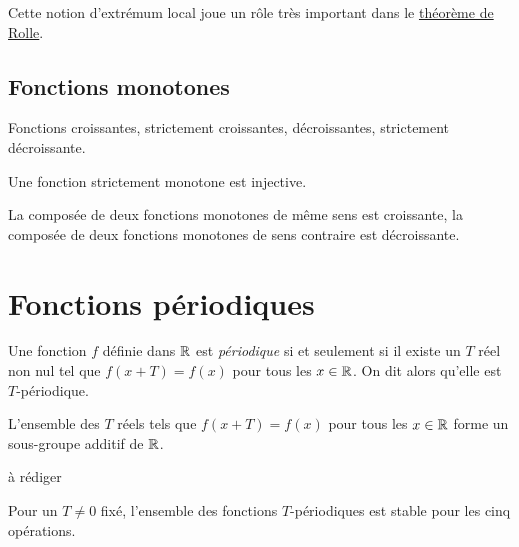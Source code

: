 Cette notion d'extrémum local joue un rôle très important dans le  \href{\baseurl C2070.pdf}{théorème de Rolle}.

\subsection{Fonctions monotones}
Fonctions croissantes, strictement croissantes, décroissantes, strictement décroissante.
\begin{rem}
 Une fonction strictement monotone est injective.
\end{rem}

\begin{prop}
 La composée de deux fonctions monotones de même sens est croissante, la composée de deux fonctions monotones de sens contraire est décroissante.
\end{prop}
 
\section{Fonctions périodiques}
\begin{defi}
 Une fonction $f$ définie dans $\mathbb{R}$ est \emph{périodique} si et seulement si il existe un $T$ réel non nul tel que $f(x+T)=f(x)$ pour tous les $x\in\mathbb{R}$. On dit alors qu'elle est $T$-périodique.
\end{defi}
\begin{prop}
 L'ensemble des $T$ réels tels que $f(x+T)=f(x)$ pour tous les $x\in\mathbb{R}$ forme un sous-groupe additif de $\mathbb{R}$.
\end{prop}
\begin{demo}
 à rédiger
\end{demo}
Pour un $T\neq 0$ fixé, l'ensemble des fonctions $T$-périodiques est stable pour les cinq opérations.
